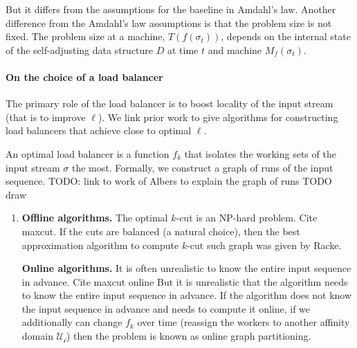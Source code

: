 But it differs from the assumptions for the baseline in Amdahl's law.
Another difference from the Amdahl's law assumptions is that the problem size is not fixed. The problem size at a machine, $T(f(\sigma_t))$, depends on the internal state of the self-adjusting data structure $D$ at time $t$ and machine $M_f(\sigma_t)$.




\paragraph*{On the choice of a load balancer}

The primary role of the load balancer is to boost locality of the input stream (that is to improve $\ell$).
We link prior work to give algorithms for constructing load balancers that achieve close to optimal $\ell$.


An optimal load balancer is a function $f_k$ that isolates the working sets of the input stream $\sigma$ the most. Formally, we construct a graph of runs of the input sequence. 
TODO: link to work of Albers to explain the graph of runs
TODO draw


\begin{enumerate}
	\item 
\textbf{Offline algorithms.}
The optimal $k$-cut is an NP-hard problem.
Cite maxcut.
If the cuts are balanced (a natural choice), then the best approximation algorithm to compute $k$-cut such graph was given by Racke.

\textbf{Online algorithms.}
It is often unrealistic to know the entire input sequence in advance.
Cite maxcut online %
But it is unrealistic that the algorithm needs to know the entire input sequence in advance. If the algorithm does not know the input sequence in advance and needs to compute it online, if we additionally can change $f_k$ over time (reassign the workers to another affinity domain $\mathcal{U_i}$) then the problem is known as online graph partitioning.


\end{enumerate}






